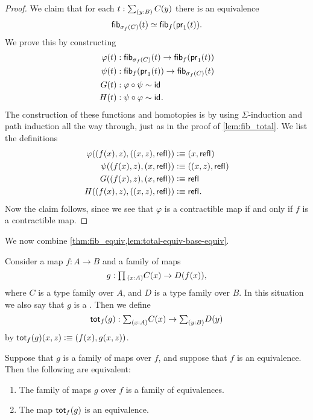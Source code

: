 \begin{proof}
  We claim that for each $t:\sm{y:B}C(y)$ there is an equivalence
  \begin{equation*}
    \fib{\sigma_f(C)}{t}\simeq \fib{f}{\proj 1(t)}.
  \end{equation*}
  We prove this by constructing
  \begin{align*}
    \varphi(t) & : \fib{\sigma_f(C)}{t}\to\fib{f}{\proj 1 (t)} \\
    \psi(t) & : \fib{f}{\proj 1(t)} \to\fib{\sigma_f(C)}{t} \\
    G(t) & : \varphi\circ\psi\htpy\idfunc\\
    H(t) & : \psi\circ\varphi\htpy\idfunc.
  \end{align*}
  The construction of these functions and homotopies is by using $\Sigma$-induction and path induction all the way through, just as in the proof of \cref{lem:fib_total}. We list the definitions
  \begin{align*}
    \varphi((f(x),z),((x,z),\refl{})) & \defeq (x,\refl{}) \\
    \psi((f(x),z),(x,\refl{})) & \defeq ((x,z),\refl{}) \\
    G((f(x),z),(x,\refl{})) & \defeq \refl{} \\
    H((f(x),z),((x,z),\refl{})) & \defeq \refl{}.
  \end{align*}
  Now the claim follows, since we see that $\varphi$ is a contractible map if and only if $f$ is a contractible map.
\end{proof}

We now combine \cref{thm:fib_equiv,lem:total-equiv-base-equiv}.

\begin{defn}
  Consider a map $f:A\to B$ and a family of maps
  \begin{equation*}
    g:\prd{x:A}C(x)\to D(f(x)),
  \end{equation*}
  where $C$ is a type family over $A$, and $D$ is a type family over $B$. In this situation we also say that $g$ is a . Then we define
  \begin{equation*}
    \tot[f]{g}:\sm{x:A}C(x)\to\sm{y:B}D(y)
  \end{equation*}
  by $\tot[f]{g}(x,z)\defeq (f(x),g(x,z))$.
\end{defn}

\begin{thm}
  Suppose that $g$ is a family of maps over $f$, and suppose that $f$ is an equivalence. Then the following are equivalent:
  \begin{enumerate}
  \item The family of maps $g$ over $f$ is a family of equivalences.
  \item The map $\tot[f]{g}$ is an equivalence.
  \end{enumerate}
\end{thm}

